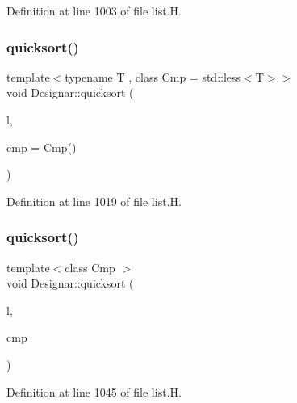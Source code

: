 Definition at line 1003 of file list.\+H.

\mbox{\label{namespace_designar_a7a2c6974344050666f37a5f9cdf889a4}} 
\subsubsection{\texorpdfstring{quicksort()}{quicksort()}\hspace{0.1cm}{\footnotesize\ttfamily [3/14]}}
{\footnotesize\ttfamily template$<$typename T , class Cmp  = std\+::less$<$\+T$>$$>$ \\
void Designar\+::quicksort (\begin{DoxyParamCaption}\item[{\hyperlink{class_designar_1_1_node_s_l_list}{Node\+S\+L\+List}$<$ T $>$ \&}]{l,  }\item[{Cmp \&\&}]{cmp = {\ttfamily Cmp()} }\end{DoxyParamCaption})\hspace{0.3cm}{\ttfamily [inline]}}



Definition at line 1019 of file list.\+H.

\mbox{\label{namespace_designar_a8c58e24da6b5bd73a9218ece3ec9f54f}} 
\subsubsection{\texorpdfstring{quicksort()}{quicksort()}\hspace{0.1cm}{\footnotesize\ttfamily [4/14]}}
{\footnotesize\ttfamily template$<$class Cmp $>$ \\
void Designar\+::quicksort (\begin{DoxyParamCaption}\item[{\hyperlink{class_designar_1_1_d_l}{DL} \&}]{l,  }\item[{Cmp \&}]{cmp }\end{DoxyParamCaption})\hspace{0.3cm}{\ttfamily [inline]}}



Definition at line 1045 of file list.\+H.

\mbox{\label{namespace_designar_abeece6dc0f858ceaf46690f5b26b2512}} 
